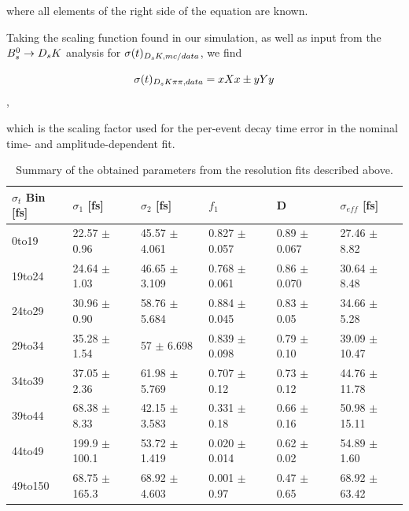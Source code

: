 where all elements of the right side of the equation are known. \newline

Taking the scaling function found in our simulation, as well as input from the ${{B}^0_{s}}\rightarrow{\ensuremath{{D}_{s}}}{\ensuremath{K}}$ analysis for $\sigma(t)_{{{D}_{s}}{K},mc/data}$, we find

\[\sigma(t)_{{{D}_{s}}{K}{\pi}{\pi},data} = xXx \pm yYy\],

which is the scaling factor used for the per-event decay time error in the nominal time- and amplitude-dependent fit. 


\begin{table}[h]
\centering
 \begin{tabular}{l || l l l | l l}
$\sigma_{t}$ Bin [fs] & $\sigma_{1}$ [fs] & $\sigma_{2}$ [fs] & $f_{1}$ & D & $\sigma_{eff}$ [fs] \\
\hline
0to19 & 22.57 $\pm$ 0.96 & 45.57 $\pm$ 4.061 & 0.827 $\pm$ 0.057 & 0.89 $\pm$ 0.067 & 27.46 $\pm$ 8.82 \\
19to24 & 24.64 $\pm$ 1.03 & 46.65 $\pm$ 3.109 & 0.768 $\pm$ 0.061 & 0.86 $\pm$ 0.070 & 30.64 $\pm$ 8.48 \\
24to29 & 30.96 $\pm$ 0.90 & 58.76 $\pm$ 5.684 & 0.884 $\pm$ 0.045 & 0.83 $\pm$ 0.05 & 34.66 $\pm$ 5.28 \\
29to34 & 35.28 $\pm$ 1.54 & 57 $\pm$ 6.698 & 0.839 $\pm$ 0.098 & 0.79 $\pm$ 0.10 & 39.09 $\pm$ 10.47 \\
34to39 & 37.05 $\pm$ 2.36 & 61.98 $\pm$ 5.769 & 0.707 $\pm$ 0.12 & 0.73 $\pm$ 0.12 & 44.76 $\pm$ 11.78 \\
39to44 & 68.38 $\pm$ 8.33 & 42.15 $\pm$ 3.583 & 0.331 $\pm$ 0.18 & 0.66 $\pm$ 0.16 & 50.98 $\pm$ 15.11 \\
44to49 & 199.9 $\pm$ 100.1 & 53.72 $\pm$ 1.419 & 0.020 $\pm$ 0.014 & 0.62 $\pm$ 0.02 & 54.89 $\pm$ 1.60 \\
49to150 & 68.75 $\pm$ 165.3 & 68.92 $\pm$ 4.603 & 0.001 $\pm$ 0.97 & 0.47 $\pm$ 0.65 & 68.92 $\pm$ 63.42 \\
\hline
\end{tabular}
\caption{Summary of the obtained parameters from the resolution fits described above.}
\label{table:ResoParams}
\end{table}


